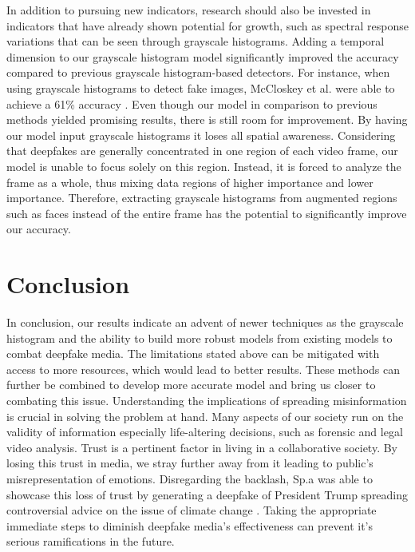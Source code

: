\documentclass[a4paper]{article}
\begin{document}
\par
In addition to pursuing new indicators, research should also be invested in indicators that have already shown potential for growth, such as spectral response variations that can be seen through grayscale histograms. Adding a temporal dimension to our grayscale histogram model significantly improved the accuracy compared to previous grayscale histogram-based detectors. For instance, when using grayscale histograms to detect fake images, McCloskey et al. were able to achieve a 61\% accuracy \cite{Color_Cues}. Even though our model in comparison to previous methods yielded promising results, there is still room for improvement. By having our model input grayscale histograms it loses all spatial awareness. Considering that deepfakes are generally concentrated in one region of each video frame, our model is unable to focus solely on this region. Instead, it is forced to analyze the frame as a whole, thus mixing data regions of higher importance and lower importance. Therefore, extracting grayscale histograms from augmented regions such as faces instead of the entire frame has the potential to significantly improve our accuracy.


\section{Conclusion}

In conclusion, our results indicate an advent of newer techniques as the grayscale histogram and the ability to build more robust models from existing models to combat deepfake media. The limitations stated above can be mitigated with access to more resources, which would lead to better results. These methods can further be combined to develop more accurate model and bring us closer to combating this issue. Understanding the implications of spreading misinformation is crucial in solving the problem at hand. Many aspects of our society run on the validity of information especially life-altering decisions, such as forensic and legal video analysis. Trust is a pertinent factor in living in a collaborative society. By losing this trust in media, we stray further away from it leading to public's misrepresentation of emotions. Disregarding the backlash, Sp.a was able to showcase this loss of trust by generating a deepfake of President Trump spreading controversial advice on the issue of climate change \cite{Misinformation}. Taking the appropriate immediate steps to diminish deepfake media's effectiveness can prevent it's serious ramifications in the future.
\end{document}
